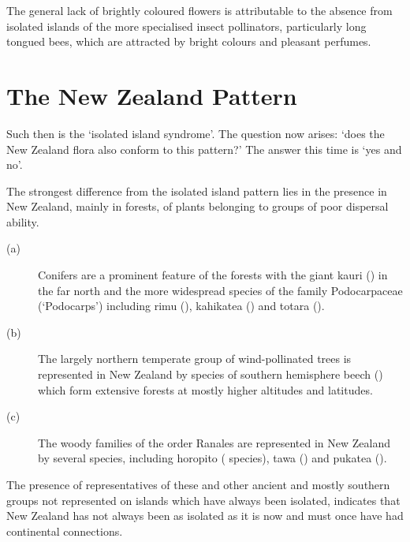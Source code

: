 The general lack of brightly coloured flowers is attributable to the absence from isolated islands of the more specialised insect pollinators, particularly long tongued bees, which are attracted by bright colours and pleasant perfumes.

\section{The New Zealand Pattern}

Such then is the `isolated island syndrome'.
The question now arises: `does the New Zealand flora also conform to this pattern?' The answer this time is `yes and no'.

The strongest difference from the isolated island pattern lies in the presence in New Zealand, mainly in forests, of plants belonging to groups of poor dispersal ability.

\begin{description}
\item[{(a)}]Conifers are a prominent feature of the forests with the giant kauri () in the far north and the more widespread species of the family Podocarpaceae (`Podocarps') including rimu (), kahikatea () and totara ().
\item[{(b)}]The largely northern temperate group of wind-pollinated trees is represented in New Zealand by species of southern hemisphere beech () which form extensive forests at mostly higher altitudes and latitudes.
\item[{(c)}]The woody families of the order Ranales are represented in New Zealand by several species, including horopito ( species), tawa () and pukatea ().
\end{description}

The presence of representatives of these and other ancient and mostly southern groups not represented on islands which have always been isolated, indicates that New Zealand has not always been as isolated as it is now and must once have had continental connections.

